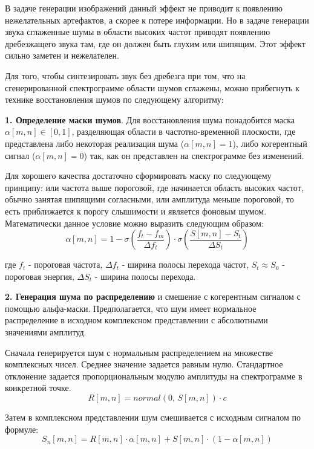 В задаче генерации изображений данный эффект не приводит к появлению нежелательных артефактов, а скорее к потере информации. 
Но в задаче генерации звука сглаженные шумы в области высоких частот приводят появлению дребезжащего звука там, 
где он должен быть глухим или шипящим. Этот эффект сильно заметен и нежелателен.

Для того, чтобы синтезировать звук без дребезга при том, что на сгенерированной спектрограмме области шумов сглажены, 
можно прибегнуть к технике восстановления шумов по следующему алгоритму:

\textbf{1. Определение маски шумов}. Для восстановления шума понадобится маска $\alpha[m,n] \in [0, 1]$, 
разделяющая области в частотно-временной плоскости, где представлена либо некоторая реализация шума ($\alpha[m,n] = 1$), 
либо когерентный сигнал ($\alpha[m,n] = 0$) так, как он представлен на спектрограмме без изменений.

Для хорошего качества достаточно сформировать маску по следующему принципу: или частота выше пороговой, где начинается область высоких частот,
обычно занятая шипящими согласными, или амплитуда меньше пороговой, то есть приближается к порогу слышимости и является фоновым шумом.
Математически данное условие можно выразить следующим образом:
\begin{equation}
  \alpha[m,n] = 1 - \sigma\left(\frac{f_t - f_m}{\Delta f_t}\right) \cdot \sigma\left(\frac{S[m,n] - S_t}{\Delta S_t}\right)
\end{equation}

где $f_t$ - пороговая частота, $\Delta f_t$ - ширина полосы перехода частот, $S_t \approx S_0$ - пороговая энергия, 
$\Delta S_t$ - ширина полосы перехода.

\textbf{2. Генерация шума по распределению} и смешение с когерентным сигналом с помощью альфа-маски.
Предполагается, что шум имеет нормальное распределение в исходном комплексном представлении с абсолютными значениями амплитуд.

Сначала генерируется шум с нормальным распределением на множестве комплексных чисел. Среднее значение задается равным нулю.
Стандартное отклонение задается пропорциональным модулю амплитуды на спектрограмме в конкретной точке.
\begin{equation}
  R[m,n] = normal(0,\, S[m,n]) \cdot c
\end{equation}

Затем в комплексном представлении шум смешивается с исходным сигналом по формуле:
\begin{equation}
  S_n[m,n] = R[m,n] \cdot \alpha[m,n] + S[m,n] \cdot (1 - \alpha[m,n])
\end{equation}


